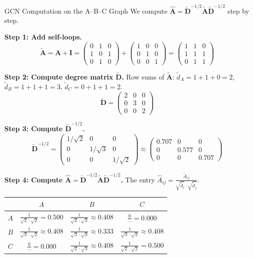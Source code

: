 \begin{examplebox}{GCN Computation on the A--B--C Graph}
We compute $\hat{\mathbf{A}} = \tilde{\mathbf{D}}^{-1/2} \tilde{\mathbf{A}} \tilde{\mathbf{D}}^{-1/2}$ step by step.

\textbf{Step 1: Add self-loops.}
\[
\tilde{\mathbf{A}} = \mathbf{A} + \mathbf{I} =
\begin{pmatrix} 0 & 1 & 0 \\ 1 & 0 & 1 \\ 0 & 1 & 0 \end{pmatrix}
+
\begin{pmatrix} 1 & 0 & 0 \\ 0 & 1 & 0 \\ 0 & 0 & 1 \end{pmatrix}
=
\begin{pmatrix} 1 & 1 & 0 \\ 1 & 1 & 1 \\ 0 & 1 & 1 \end{pmatrix}
\]

\textbf{Step 2: Compute degree matrix $\tilde{\mathbf{D}}$.}
Row sums of $\tilde{\mathbf{A}}$: $\tilde{d}_A = 1+1+0 = 2$, $\tilde{d}_B = 1+1+1 = 3$, $\tilde{d}_C = 0+1+1 = 2$.
\[
\tilde{\mathbf{D}} = \begin{pmatrix} 2 & 0 & 0 \\ 0 & 3 & 0 \\ 0 & 0 & 2 \end{pmatrix}
\]

\textbf{Step 3: Compute $\tilde{\mathbf{D}}^{-1/2}$.}
\[
\tilde{\mathbf{D}}^{-1/2} = \begin{pmatrix} 1/\sqrt{2} & 0 & 0 \\ 0 & 1/\sqrt{3} & 0 \\ 0 & 0 & 1/\sqrt{2} \end{pmatrix}
\approx \begin{pmatrix} 0.707 & 0 & 0 \\ 0 & 0.577 & 0 \\ 0 & 0 & 0.707 \end{pmatrix}
\]

\textbf{Step 4: Compute $\hat{\mathbf{A}} = \tilde{\mathbf{D}}^{-1/2} \tilde{\mathbf{A}} \tilde{\mathbf{D}}^{-1/2}$.}
The entry $\hat{A}_{ij} = \frac{\tilde{A}_{ij}}{\sqrt{\tilde{d}_i} \cdot \sqrt{\tilde{d}_j}}$.

\medskip
\begin{center}
\renewcommand{\arraystretch}{1.5}
\begin{tabular}{c|ccc}
    & $A$ & $B$ & $C$ \\
\hline
$A$ & $\frac{1}{\sqrt{2}\cdot\sqrt{2}} = 0.500$ & $\frac{1}{\sqrt{2}\cdot\sqrt{3}} \approx 0.408$ & $\frac{0}{\cdots} = 0.000$ \\
$B$ & $\frac{1}{\sqrt{3}\cdot\sqrt{2}} \approx 0.408$ & $\frac{1}{\sqrt{3}\cdot\sqrt{3}} \approx 0.333$ & $\frac{1}{\sqrt{3}\cdot\sqrt{2}} \approx 0.408$ \\
$C$ & $\frac{0}{\cdots} = 0.000$ & $\frac{1}{\sqrt{2}\cdot\sqrt{3}} \approx 0.408$ & $\frac{1}{\sqrt{2}\cdot\sqrt{2}} = 0.500$ \\
\end{tabular}
\end{center}


\end{examplebox}
